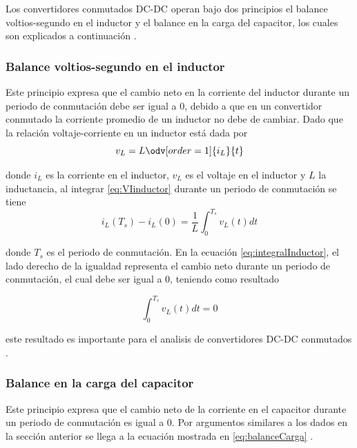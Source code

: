 Los convertidores conmutados DC-DC operan bajo dos principios el balance voltios-segundo en el inductor y el balance en la carga del capacitor, los cuales son explicados a continuación \cite{erickson_fundamentals_2020}.


\subsubsection*{Balance voltios-segundo en el inductor}

 Este principio expresa que el cambio neto en la corriente del inductor
durante un periodo de conmutación debe ser igual a 0, debido a que en un convertidor conmutado
la corriente promedio de un inductor no debe de cambiar. Dado que la relación voltaje-corriente en un  inductor está dada por
\begin{equation}
    v_L = L \odv[order=1]{i_L}{t}
    \label{eq:VIinductor}
\end{equation}

donde $i_L$ es la corriente en el inductor, $v_L$ es el voltaje en el inductor
y $L$ la inductancia, al integrar \ref{eq:VIinductor} durante un periodo de conmutación
se tiene 
\begin{equation}
i_L\left(T_s\right)-i_L(0)=\frac{1}{L} \int_0^{T_s} v_L(t) d t
\label{eq:integralInductor}
\end{equation}

donde $T_s$ es el periodo de conmutación. En la ecuación \ref{eq:integralInductor}, el lado
derecho de la igualdad representa el cambio neto durante un periodo de conmutación, el cual 
debe ser igual a 0, teniendo como resultado

\begin{equation}
    \int_0^{T_s} v_L(t) d t = 0
\end{equation}

este resultado es importante para el analisis de convertidores DC-DC conmutados \cite{erickson_fundamentals_2020}.

\subsubsection*{Balance en la carga del capacitor}

Este principio expresa que el cambio neto de la corriente en el capacitor durante un periodo 
de conmutación es igual a 0. Por argumentos similares a los dados en la sección anterior se 
llega a la ecuación mostrada en \ref{eq:balanceCarga} \cite{erickson_fundamentals_2020}.

